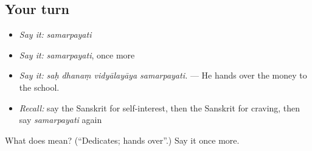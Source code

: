\subsection*{Your turn}
\begin{itemize}
\raggedright
  \item \emph{Say it:} \emph{samarpayati}
  \item \emph{Say it:} \emph{samarpayati}, once more
  \item \emph{Say it:} \emph{saḥ dhanaṃ vidyālayāya samarpayati.} — He hands over the money to the school.
  \item \emph{Recall:} say the Sanskrit for self-interest, then the Sanskrit for craving, then say \emph{samarpayati} again
\end{itemize}

\begin{tcolorbox}[breakable,colback=teal!4,colframe=teal!35!black,title={Before you move on}]
What does  mean? (\textquotedblleft{}Dedicates; hands over\textquotedblright{}.) Say it once more.
\end{tcolorbox}
